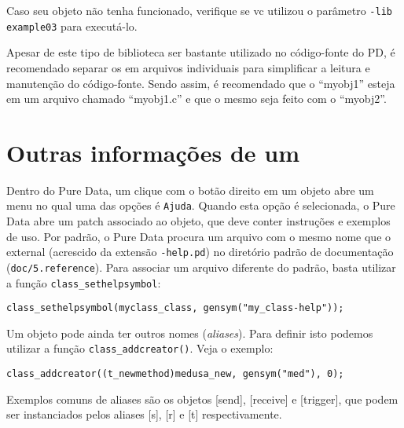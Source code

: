 
Caso seu objeto não tenha funcionado, verifique se vc utilizou o parâmetro 
\texttt{-lib example03} para executá-lo.


Apesar de este tipo de biblioteca ser bastante utilizado no código-fonte do PD,
é recomendado separar os \external em arquivos individuais para simplificar
a leitura e manutenção do código-fonte.
Sendo assim, é recomendado que o \external ``myobj1'' esteja em um arquivo
chamado ``myobj1.c'' e que o mesmo seja feito com o \external ``myobj2''.

\section{Outras informações de um \external}

Dentro do Pure Data, um clique com o botão direito em um objeto abre um menu
no qual uma das opções é \texttt{Ajuda}. Quando esta opção é selecionada, o
Pure Data abre um patch associado ao objeto, que deve conter instruções e
exemplos de uso. Por padrão, o Pure Data procura um arquivo com o mesmo nome
que o external (acrescido da extensão \texttt{-help.pd}) no diretório padrão de
documentação (\texttt{doc/5.reference}). Para associar um arquivo diferente do
padrão, basta utilizar a função \texttt{class\_sethelpsymbol}:

\vspace{1em}
\begin{lstlisting}[caption=Definição de arquivo de help]
class_sethelpsymbol(myclass_class, gensym("my_class-help"));
\end{lstlisting}

Um objeto pode ainda ter outros nomes (\emph{aliases}). Para definir isto
podemos utilizar a função \texttt{class\_addcreator()}. Veja o exemplo:

\vspace{1em}
\begin{lstlisting}[caption=Definição de alias para um objeto]
class_addcreator((t_newmethod)medusa_new, gensym("med"), 0);
\end{lstlisting}

Exemplos comuns de aliases são os objetos [send], [receive] e [trigger], que
podem ser instanciados pelos aliases [s], [r] e [t] respectivamente.

